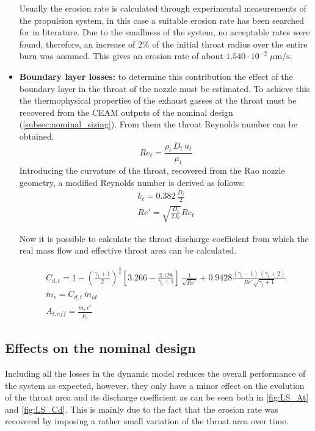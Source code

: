 \begin{itemize}
    Usually the erosion rate is calculated through experimental measurements of the propulsion system, in this case a suitable erosion rate has been searched for in literature. Due to the smallness of the system, no acceptable rates were found, therefore, an increase of 2\% of the initial throat radius over the entire burn was assumed. This gives an erosion rate of about $1.540 \cdot 10^{-2} \; \mu \textrm{m} / \textrm{s}$. \cite{Sutton}\cite{tesi_malesia}
    \item \textbf{Boundary layer losses:} to determine this contribution the effect of the boundary layer in the throat of the nozzle must be estimated. To achieve this the thermophysical properties of the exhaust gasses at the throat must be recovered from the CEAM outputs of the nominal design (\autoref{subsec:nominal_sizing}). From them the throat Reynolds number can be obtained.
    \begin{equation}
        Re_t = \frac{\rho_t \, D_t \, u_t}{\mu_t}
    \end{equation}
Introducing the curvature of the throat, recovered from the Rao nozzle geometry, a modified Reynolds number is derived as follows:
    \begin{gather}
        k_t = 0.382 \, \frac{D_t}{2} \\
        Re'=\sqrt{\frac{D_t}{2 \, k_t}}Re_t
    \end{gather}  

    Now it is possible to calculate the throat discharge coefficient from which the real mass flow and effective throat area can be calculated.  

    \begin{gather}
        C_{d,t} = 1 - \left( \frac{\gamma_t+1}{2} \right)^{\frac{3}{4}}
        \left[3.266 - \frac{2.128}{\gamma_t+1} \right] \, \frac{1}{\sqrt{Re'}} + 0.9428 \frac{(\gamma_t - 1) \, (\gamma_t + 2)}{Re' \sqrt{\gamma_t + 1}} \\
        \dot{m}_r = C_{d,t} \, \dot{m}_{id} \\
        A_{t,eff} = \frac{\dot{m}_r \, c^*}{p_c}
    \end{gather}
\end{itemize}

\subsection{Effects on the nominal design}  

Including all the losses in the dynamic model reduces the overall performance of the system as expected, however, they only have a minor effect on the evolution of the throat area and its discharge coefficient as can be seen both in \autoref{fig:LS_At} and \autoref{fig:LS_Cd}. This is mainly due to the fact that the erosion rate was recovered by imposing a rather small variation of the throat area over time. 

